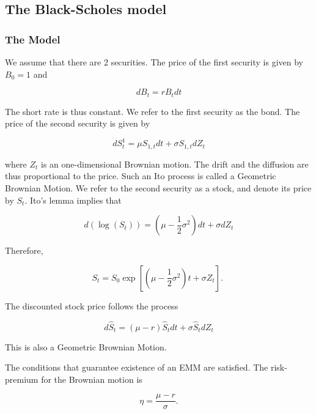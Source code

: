 \documentclass[\topdir/lecture\_notes.tex]{subfiles}
\begin{document}
\subsection{The Black-Scholes model}
\subsubsection{The Model}
We assume that there are 2 securities. The price of the first security is given by \(B_{0}=1\) and

\begin{equation}
d B_{t}=r B_{t} d t \label{eq:6.3.1}
\end{equation}

The short rate is thus constant. We refer to the first security as the bond. The price of the second security is given by

\begin{equation}
d S_{t}^{1}=\mu S_{1, t} d t+\sigma S_{1, t} d Z_{t} \label{eq:6.3.2}
\end{equation}

where \(Z_{t}\) is an one-dimensional Brownian motion. The drift and the diffusion are thus proportional to the price. Such an Ito process is called a Geometric Brownian Motion. We refer to the second security as a stock, and denote its price by \(S_{t}\). Ito's lemma implies that

\begin{equation}
d\left(\log \left(S_{t}\right)\right)=\left(\mu-\frac{1}{2} \sigma^{2}\right) d t+\sigma d Z_{t}
\end{equation}

Therefore,

\begin{equation}
S_{t}=S_{0} \exp \left[\left(\mu-\frac{1}{2} \sigma^{2}\right) t+\sigma Z_{t}\right] \text {. }
\end{equation}

The discounted stock price follows the process

\begin{equation}
d \hat{S}_{t}=(\mu-r) \hat{S}_{t} d t+\sigma \hat{S}_{t} d Z_{t}
\end{equation}

This is also a Geometric Brownian Motion.

The conditions that guarantee existence of an EMM are satisfied. The risk-premium for the Brownian motion is

\begin{equation}
\eta=\frac{\mu-r}{\sigma} .
\end{equation}
\end{document}

